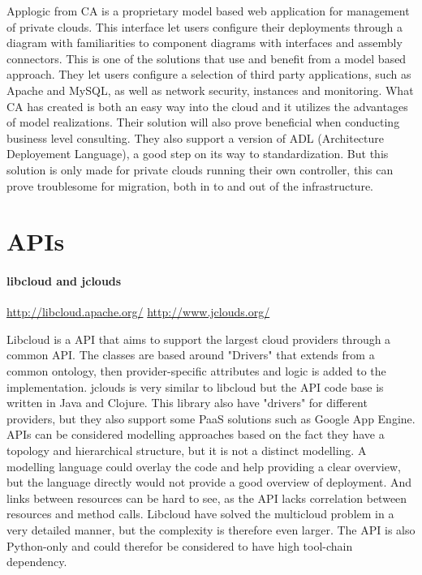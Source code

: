 Applogic from CA is a proprietary model based web application for management of private clouds. 
This interface let users configure their deployments through a diagram with familiarities to component diagrams with interfaces and assembly connectors. 
This is one of the solutions that use and benefit from a model based approach. They let users configure a selection of third party applications, 
such as Apache and MySQL, as well as network security, instances and monitoring. 
What CA has created is both an easy way into the cloud and it utilizes the advantages of model realizations. 
Their solution will also prove beneficial when conducting business level consulting. 
They also support a version of ADL (Architecture Deployement Language), a good step on its way to standardization. 
But this solution is only made for private clouds running their own controller, this can prove troublesome for migration, both in to and out of the infrastructure.

\section{APIs}

\paragraph{libcloud and jclouds}
\url{http://libcloud.apache.org/}
\url{http://www.jclouds.org/}

Libcloud is a API that aims to support the largest cloud providers through a common API. 
The classes are based around "Drivers" that extends from a common ontology, then provider-specific attributes and logic is added to the implementation.
jclouds is very similar to libcloud but the API code base is written in Java and Clojure. 
This library also have "drivers" for different providers, but they also support some PaaS solutions such as Google App Engine.
APIs can be considered modelling approaches based on the fact they have a topology and hierarchical structure, 
but it is not a distinct modelling. A modelling language could overlay the code and help providing a clear overview, 
but the language directly would not provide a good overview of deployment. 
And links between resources can be hard to see, as the API lacks correlation between resources and method calls. 
Libcloud have solved the multicloud problem in a very detailed manner, but the complexity is therefore even larger. 
The API is also Python-only and could therefor be considered to have high tool-chain dependency.

